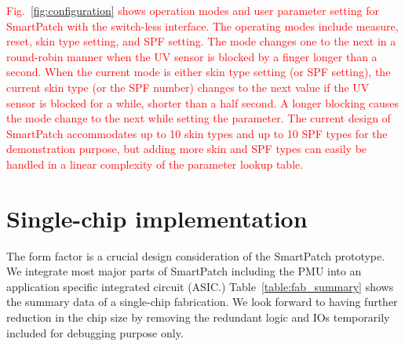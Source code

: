 \documentclass[journal]{IEEEtran}
\begin{document}

\textcolor{red}{Fig.~\ref{fig:configuration} shows operation modes and user parameter setting for SmartPatch with the switch-less interface. The operating modes include measure, reset, skin type setting, and SPF setting. The mode changes one to the next in a round-robin manner when the UV sensor is blocked by a finger longer than a second. When the current mode is either skin type setting (or SPF setting), the current skin type (or the SPF number) changes to the next value if the UV sensor is blocked for a while, shorter than a half second. A longer blocking causes the mode change to the next while setting the parameter. The current design of SmartPatch accommodates up to 10 skin types and up to 10 SPF types for the demonstration purpose, but adding more skin and SPF types can easily be handled in a linear complexity of the parameter lookup table.}

\section{Single-chip implementation}

The form factor is a crucial design consideration of the SmartPatch prototype.
We integrate most major parts of SmartPatch including the PMU into an application specific integrated circuit (ASIC.)
Table~\ref{table:fab_summary} shows the summary data of a single-chip fabrication.
We look forward to having further reduction in the chip size by removing the redundant logic and IOs temporarily included for debugging purpose only.
\end{document}
